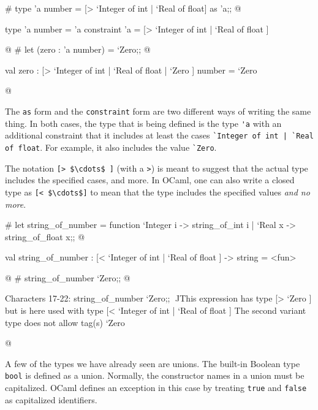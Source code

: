 \begin{ocaml}
# type 'a number = [> `Integer of int | `Real of float] as 'a;;
@
\begin{topoutput}
type 'a number = 'a constraint 'a = [> `Integer of int | `Real of float ]
\end{topoutput}
@
# let (zero : 'a number) = `Zero;;
@
\begin{topoutput}
val zero : [> `Integer of int | `Real of float | `Zero ] number = `Zero
\end{topoutput}
@
\end{ocaml}
%
The \hbox{\lstinline/as/} form and the \hbox{\lstinline/constraint/} form are two
different ways of writing the same thing.  In both cases, the type
that is being defined is the type \hbox{\lstinline/'a/} with an additional
constraint that it includes at least the cases
%
\hbox{\lstinline/`Integer of int | `Real of float/}.  For example, it also
includes the value \hbox{\lstinline/`Zero/}.


The notation \hbox{\lstinline/[> $\cdots$ ]/} (with a \hbox{\lstinline/>/}) is meant
to suggest that the actual type includes the specified cases, and
more.  In OCaml, one can also write a closed type as
%
\hbox{\lstinline/[< $\cdots$]/} to mean that the type includes the specified
values \emph{and no more}.

\begin{ocaml}
# let string_of_number = function
     `Integer i -> string_of_int i
   | `Real x -> string_of_float x;;
@
\begin{topoutput}
val string_of_number : [< `Integer of int | `Real of float ] -> string = <fun>
\end{topoutput}
@
# string_of_number `Zero;;
@
\begin{topoutput}
Characters 17-22:
  string_of_number `Zero;;
                   ^^^^^
This expression has type [> `Zero ] but is here used with type
  [< `Integer of int | `Real of float ]
The second variant type does not allow tag(s) `Zero
\end{topoutput}
@
\end{ocaml}


A few of the types we have already seen are unions.  The built-in
Boolean type \hbox{\lstinline/bool/} is defined as a union.  Normally, the
constructor names in a union must be capitalized.  OCaml defines an
exception in this case by treating \hbox{\lstinline/true/} and \hbox{\lstinline/false/}
as capitalized identifiers.

